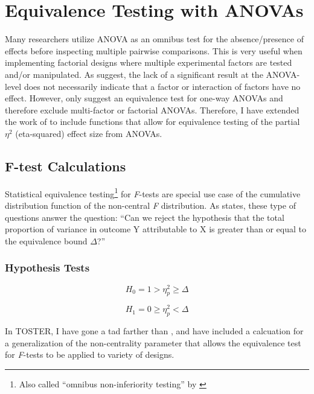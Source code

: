 \documentclass[]{interact}
\theoremstyle{plain}%
\theoremstyle{definition}
\theoremstyle{remark}
\begin{document}
\newpage

\hypertarget{equivalence-testing-with-anovas}{%
\section{Equivalence Testing with
ANOVAs}\label{equivalence-testing-with-anovas}}

Many researchers utilize ANOVA as an omnibus test for the
absence/presence of effects before inspecting multiple pairwise
comparisons. This is very useful when implementing factorial designs
where multiple experimental factors are tested and/or manipulated. As
\citet{Campbell_2021} suggest, the lack of a significant result at the
ANOVA-level does not necessarily indicate that a factor or interaction
of factors have no effect. However, \citet{Campbell_2021} only suggest
an equivalence test for one-way ANOVAs and therefore exclude
multi-factor or factorial ANOVAs. Therefore, I have extended the work of
\citet{Campbell_2021} to include functions that allow for equivalence
testing of the partial \(\eta^2\) (eta-squared) effect size from ANOVAs.

\hypertarget{f-test-calculations}{%
\subsection{F-test Calculations}\label{f-test-calculations}}

Statistical equivalence testing\footnote{Also called ``omnibus
  non-inferiority testing'' by \citet{Campbell_2021}} for \emph{F}-tests
are special use case of the cumulative distribution function of the
non-central \emph{F} distribution. As \citet{Campbell_2021} states,
these type of questions answer the question: ``Can we reject the
hypothesis that the total proportion of variance in outcome Y
attributable to X is greater than or equal to the equivalence bound
\(\Delta\)?''

\hypertarget{hypothesis-tests}{%
\subsubsection{Hypothesis Tests}\label{hypothesis-tests}}

\[
H_0 =  1 > \eta^2_p \geq \Delta
\]

\[
H_1 =  0 \geq \eta^2_p < \Delta
\]

In TOSTER, I have gone a tad farther than \citet{Campbell_2021}, and
have included a calcuation for a generalization of the non-centrality
parameter that allows the equivalence test for \emph{F}-tests to be
applied to variety of designs.
\end{document}
